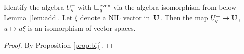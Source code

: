 \begin{Lemma}Identify the algebra $U^+_q$ with $\square^{\rm even}_q$ via the algebra isomorphism from
below Lemma~{\rm \ref{lem:add}}. Let $\xi $ denote a NIL vector in~${\bf U}$. Then the map
$U^+_q \to {\bf U}$, $u \mapsto u \xi$ is an isomorphism of vector spaces.
\end{Lemma}
\begin{proof} By Proposition \ref{prop:bij}.
\end{proof}
